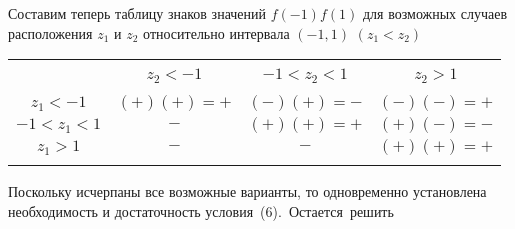 \begin{multicols*}{2}
Составим теперь таблицу знаков значений $f(-1) f(1)$ для возможных случаев расположения
$z_1$ и $z_2$ относительно интервала $(-1, 1)$
\newline
$(z_1 < z_2)$

\vspace{0.5cm}
\tiny
\setlength\extrarowheight{2pt}    
{\centering
\begin{tabular}{ c | c | c | c }
  & & & \\
  & $z_2 < -1$ & $-1 < z_2 < 1$ & $z_2 > 1$ \\
  & & & \\
  \hline
  $z_1 < -1$ & $(+)(+)=+$ & $(-)(+)=-$ & $(-)(-)=+$ \\
  $-1 < z_1 < 1$ & $-$ & $(+)(+)=+$ & $(+)(-)=-$ \\
  $z_1 > 1$ & $-$ & $-$ & $(+)(+)=+$ \\
  & & & \\
\end{tabular}
}
\normalsize
\vspace{0.35cm}


Поскольку исчерпаны все возможные варианты,
то одновременно установлена необходимость и достаточность \mbox{условия (6).
Остается решить}
\end{multicols*}